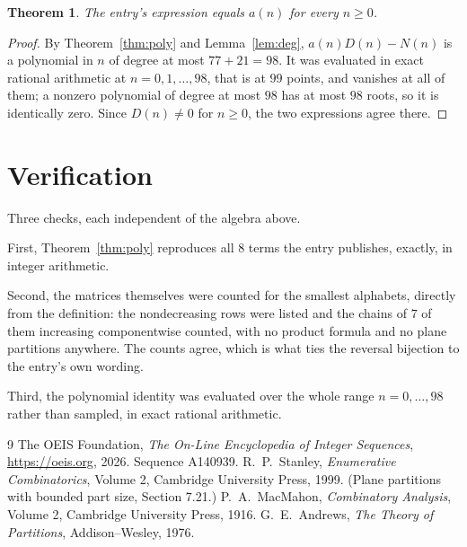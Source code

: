 \documentclass[11pt,a4paper]{article}
\theoremstyle{plain}
\newtheorem{theorem}{Theorem}
\theoremstyle{definition}
\begin{document}
\begin{theorem}
The entry's expression equals $a(n)$ for every $n\ge0$.
\end{theorem}

\begin{proof}
By Theorem~\ref{thm:poly} and Lemma~\ref{lem:deg}, $a(n)D(n)-N(n)$ is a polynomial in $n$
of degree at most $77+21=98$. It was evaluated in exact rational arithmetic at
$n=0,1,\dots,98$, that is at $99$ points, and vanishes at all of them; a nonzero polynomial
of degree at most $98$ has at most $98$ roots, so it is identically zero. Since $D(n)\neq0$
for $n\ge0$, the two expressions agree there.
\end{proof}

\section{Verification}

Three checks, each independent of the algebra above.

First, Theorem~\ref{thm:poly} reproduces all $8$ terms the entry publishes,
exactly, in integer arithmetic.

Second, the matrices themselves were counted for the smallest alphabets, directly from the
definition: the nondecreasing rows were listed and the chains of $7$ of them increasing
componentwise counted, with no product formula and no plane partitions anywhere. The counts
agree, which is what ties the reversal bijection to the entry's own wording.

Third, the polynomial identity was evaluated over the whole range $n=0,\dots,98$ rather than
sampled, in exact rational arithmetic.

\begin{thebibliography}{9}
 The OEIS Foundation, \emph{The On-Line Encyclopedia of Integer
Sequences}, \url{https://oeis.org}, 2026. Sequence A140939.
 R.~P.~Stanley, \emph{Enumerative Combinatorics}, Volume 2, Cambridge
University Press, 1999. (Plane partitions with bounded part size, Section 7.21.)
 P.~A.~MacMahon, \emph{Combinatory Analysis}, Volume 2, Cambridge
University Press, 1916.
 G.~E.~Andrews, \emph{The Theory of Partitions}, Addison--Wesley, 1976.
\end{thebibliography}
\end{document}
